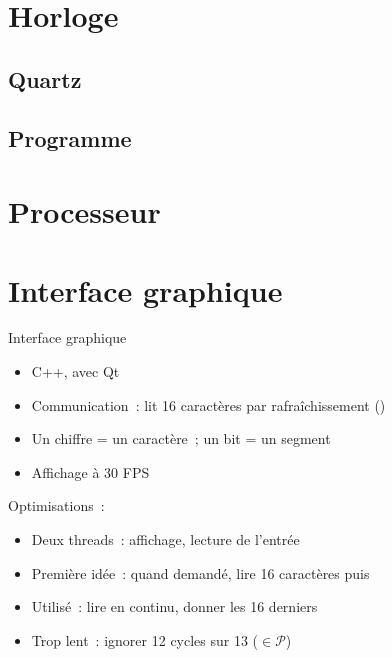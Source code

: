 \documentclass[11pt]{beamer}
\begin{document}
\section{Horloge}

\subsection{Quartz}

\subsection{Programme}



\section{Processeur}



\section{Interface graphique}

\begin{frame}{Interface graphique}
\begin{itemize}
\item C++, avec Qt
\item Communication~: lit 16 caractères par rafraîchissement ()
\item Un chiffre = un caractère~; un bit = un segment
\item Affichage à 30 FPS
\end{itemize}

\noindent Optimisations~:
\begin{itemize}
\item \alert{Deux threads}~: affichage, lecture de l'entrée
\item Première idée~: quand demandé, lire 16 caractères puis 
\item Utilisé~: lire en continu, donner les 16 derniers
\item Trop lent~: ignorer \alert{12 cycles sur 13} ($\in \mathcal{P}$)
\end{itemize}
\end{frame}
\end{document}
